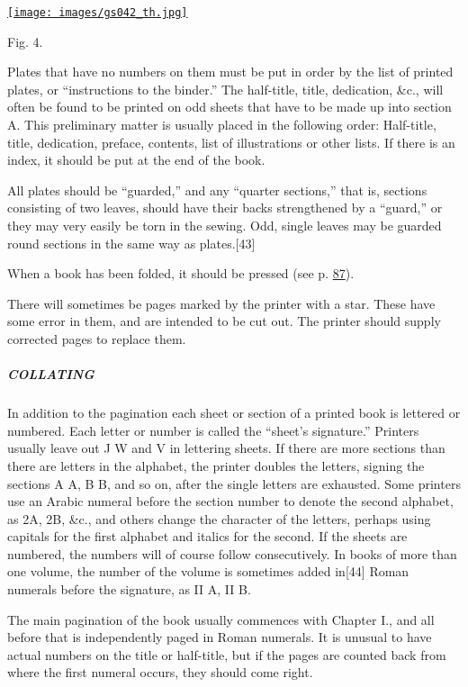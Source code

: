 \documentclass[
]{article}
\begin{document}
\href{images/gs042.jpg}{\texttt{[image: images/gs042\_th.jpg]}}\protect\hypertarget{Fig_4}{}{}

{Fig.} 4.

Plates that have no numbers on them must be put in order by the list of
printed plates, or ``instructions to the binder.'' The half-title,
title, dedication, \&c., will often be found to be printed on odd sheets
that have to be made up into section A. This preliminary matter is
usually placed in the following order: Half-title, title, dedication,
preface, contents, list of illustrations or other lists. If there is an
index, it should be put at the end of the book.

All plates should be ``guarded,'' and any ``quarter sections,'' that is,
sections consisting of two leaves, should have their backs strengthened
by a ``guard,'' or they may very easily be torn in the sewing. Odd,
single leaves may be guarded round sections in the same way as
plates.{\protect\hypertarget{Page_43}{}{{[}43{]}}}

When a book has been folded, it should be pressed (see p.
\protect\hyperlink{Page_87}{87}).

There will sometimes be pages marked by the printer with a star. These
have some error in them, and are intended to be cut out. The printer
should supply corrected pages to replace them.

\hypertarget{collating}{%
\subparagraph{COLLATING}\label{collating}}

In addition to the pagination each sheet or section of a printed book is
lettered or numbered. Each letter or number is called the ``sheet's
signature.'' Printers usually leave out J W and V in lettering sheets.
If there are more sections than there are letters in the alphabet, the
printer doubles the letters, signing the sections A A, B B, and so on,
after the single letters are exhausted. Some printers use an Arabic
numeral before the section number to denote the second alphabet, as 2A,
2B, \&c., and others change the character of the letters, perhaps using
capitals for the first alphabet and italics for the second. If the
sheets are numbered, the numbers will of course follow consecutively. In
books of more than one volume, the number of the volume is sometimes
added in{\protect\hypertarget{Page_44}{}{{[}44{]}}} Roman numerals
before the signature, as II A, II B.

The main pagination of the book usually commences with Chapter I., and
all before that is independently paged in Roman numerals. It is unusual
to have actual numbers on the title or half-title, but if the pages are
counted back from where the first numeral occurs, they should come
right.
\end{document}
